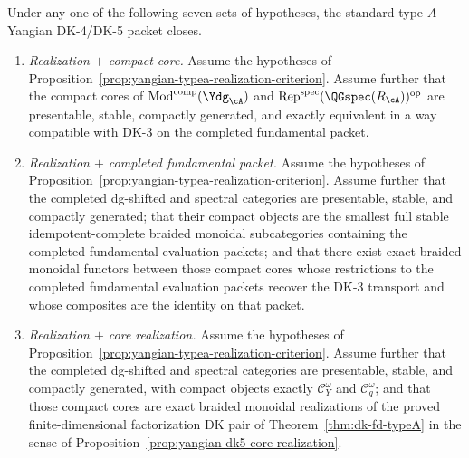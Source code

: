 \begin{theorem}
\label{thm:yangian-dk45-closure-variants}%
\label{cor:yangian-typea-realization-plus-compacts}%
\label{cor:yangian-typea-realization-plus-fundamental-packet}%
\label{cor:yangian-typea-realization-plus-core-realization}%
\label{cor:yangian-formal-moduli-plus-core-realization}%
\label{cor:yangian-typea-realization-plus-dg-packet}%
\label{cor:yangian-canonical-realization-plus-one-seed}%
\label{cor:yangian-canonical-realization-plus-vector-line}%
Under any one of the following seven sets of hypotheses, the standard
type-$A$ Yangian DK-4/DK-5 packet closes.
\begin{enumerate}[label=\textup{(\roman*)}]
\item\emph{Realization $+$ compact core.}
  Assume the hypotheses of
  Proposition~\ref{prop:yangian-typea-realization-criterion}.  Assume
  further that the compact cores of
  \(\operatorname{Mod}^{\mathrm{comp}}(\Ydg_{\cA})\) and
  \(\operatorname{Rep}^{\mathrm{spec}}(\QGspec(R_{\cA}))^{\mathrm{op}}\)
  are presentable, stable, compactly generated, and exactly equivalent
  in a way compatible with DK-3 on the completed fundamental packet.

\item\emph{Realization $+$ completed fundamental packet.}
  Assume the hypotheses of
  Proposition~\ref{prop:yangian-typea-realization-criterion}.  Assume
  further that the completed dg-shifted and spectral categories are
  presentable, stable, and compactly generated; that their compact
  objects are the smallest full stable idempotent-complete braided
  monoidal subcategories containing the completed fundamental
  evaluation packets; and that there exist exact braided monoidal
  functors between those compact cores whose restrictions to the
  completed fundamental evaluation packets recover the DK-3 transport
  and whose composites are the identity on that packet.

\item\emph{Realization $+$ core realization.}
  Assume the hypotheses of
  Proposition~\ref{prop:yangian-typea-realization-criterion}.  Assume
  further that the completed dg-shifted and spectral categories are
  presentable, stable, and compactly generated, with compact objects
  exactly $\mathcal{C}_Y^\omega$ and $\mathcal{C}_q^\omega$; and that
  those compact cores are exact braided monoidal realizations of the
  proved finite-dimensional factorization DK pair of
  Theorem~\ref{thm:dk-fd-typeA} in the sense of
  Proposition~\ref{prop:yangian-dk5-core-realization}.


\end{enumerate}
\end{theorem}

